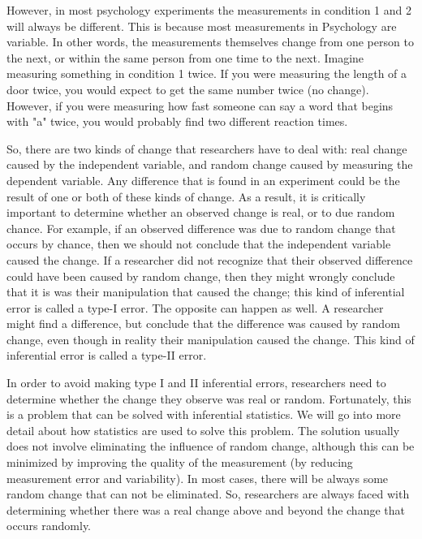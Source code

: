 However, in most psychology experiments the measurements in condition 1 and 2 will always be different. This is because most measurements in Psychology are variable. In other words, the measurements themselves change from one person to the next, or within the same person from one time to the next. Imagine measuring something in condition 1 twice. If you were measuring the length of a door twice, you would expect to get the same number twice (no change). However, if you were measuring how fast someone can say a word that begins with "a" twice, you would probably find two different reaction times. 

So, there are two kinds of change that researchers have to deal with: real change caused by the independent variable, and random change caused by measuring the dependent variable. Any difference that is found in an experiment could be the result of one or both of these kinds of change. As a result, it is critically important to determine whether an observed change is real, or to due random chance. For example, if an observed difference was due to random change that occurs by chance, then we should not conclude that the independent variable caused the change. If a researcher did not recognize that their observed difference could have been caused by random change, then they might wrongly conclude that it is was their manipulation that caused the change; this kind of inferential error is called a type-I error. The opposite can happen as well. A researcher might find a difference, but conclude that the difference was caused by random change, even though in reality their manipulation caused the change. This kind of inferential error is called a type-II error. 

In order to avoid making type I and II inferential errors, researchers need to determine whether the change they observe was real or random. Fortunately, this is a problem that can be solved with inferential statistics. We will go into more detail about how statistics are used to solve this problem. The solution usually does not involve eliminating the influence of random change, although this can be minimized by improving the quality of the measurement (by reducing measurement error and variability). In most cases, there will be always some random change that can not be eliminated. So, researchers are always faced with determining whether there was a real change above and beyond the change that occurs randomly. 

